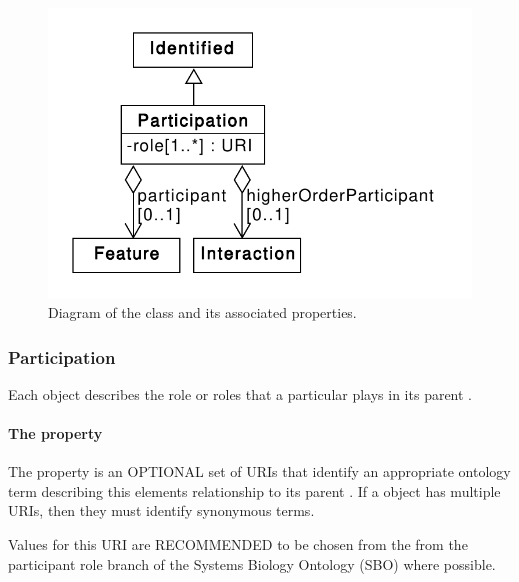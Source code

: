 \begin{figure}[ht]
\begin{center}
\includegraphics[scale=0.6]{uml/participation}
\caption[]{Diagram of the  class and its associated properties.}
\label{uml:participation}
\end{center}
\end{figure}

\subsubsection{Participation}
\label{sec:Participation}


Each  object describes the role or roles that a
particular  plays in its parent
.

\paragraph{The  property}\label{sec:roles}

The  property is an OPTIONAL set of URIs that identify an appropriate ontology term describing this elements relationship to its parent . 
If a  object has multiple
 URIs, then they must identify synonymous terms.

Values for this URI are RECOMMENDED to be chosen from the from the participant role branch of the Systems Biology Ontology (SBO) where possible.


